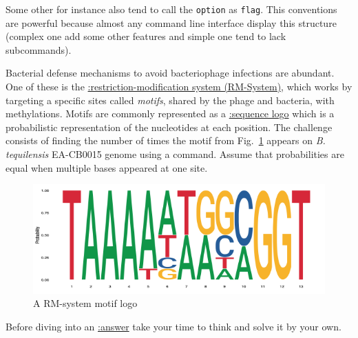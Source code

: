\documentclass[
  letterpaper,
  DIV=11,
  numbers=noendperiod,
  oneside]{scrreprt}
\begin{document}
Some other for instance also tend to call the \texttt{option} as
\texttt{flag}. This conventions are powerful because almost any command
line interface display this structure (complex one add some other
features and simple one tend to lack subcommands).

\begin{tcolorbox}[enhanced jigsaw, opacityback=0, leftrule=.75mm, breakable, titlerule=0mm, toprule=.15mm, rightrule=.15mm, title=\textcolor{quarto-callout-warning-color}{\faExclamationTriangle}\hspace{0.5em}{Challenge}, colback=white, opacitybacktitle=0.6, toptitle=1mm, bottomtitle=1mm, colframe=quarto-callout-warning-color-frame, colbacktitle=quarto-callout-warning-color!10!white, arc=.35mm, coltitle=black, bottomrule=.15mm, left=2mm]
Bacterial defense mechanisms to avoid bacteriophage infections are
abundant. One of these is the
\href{https://en.wikipedia.org/wiki/Restriction_modification_system}{:restriction-modification
system (RM-System)}, which works by targeting a specific sites called
\emph{motifs}, shared by the phage and bacteria, with methylations.
Motifs are commonly represented as a
\href{https://en.wikipedia.org/wiki/Sequence_logo}{:sequence logo} which
is a probabilistic representation of the nucleotides at each position.
The challenge consists of finding the number of times the motif from
Fig.~\ref{fig-motif} appears on \emph{B. tequilensis} EA-CB0015 genome
using a command. Assume that probabilities are equal when multiple bases
appeared at one site.

\begin{figure}

{\centering \includegraphics{chs-command-line/imgs-cli/motif.png}

}

\caption{\label{fig-motif}A RM-system motif logo}

\end{figure}

Before diving into an \protect\hyperlink{motif-search}{:answer} take
your time to think and solve it by your own.
\end{tcolorbox}
\end{document}
